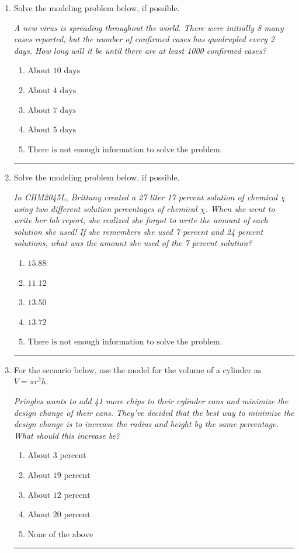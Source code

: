 \documentclass[14pt]{extbook}
\newcommand{\litem}[1]{\item#1\hspace*{-1cm}\rule{\textwidth}{0.4pt}}
\begin{document}
\begin{enumerate}
{\begin{enumerate}[label=\Alph*.]
\end{enumerate} }
\litem{
Solve the modeling problem below, if possible.
\begin{center}
    \textit{ A new virus is spreading throughout the world. There were initially 8 many cases reported, but the number of confirmed cases has quadrupled every 2 days. How long will it be until there are at least 1000 confirmed cases? }
\end{center}
\begin{enumerate}[label=\Alph*.]
\item \( \text{About } 10 \text{ days} \)
\item \( \text{About } 4 \text{ days} \)
\item \( \text{About } 7 \text{ days} \)
\item \( \text{About } 5 \text{ days} \)
\item \( \text{There is not enough information to solve the problem.} \)

\end{enumerate} }
\litem{
Solve the modeling problem below, if possible.
\begin{center}
    \textit{ In CHM2045L, Brittany created a 27 liter 17 percent solution of chemical $\chi$ using two different solution percentages of chemical $\chi$. When she went to write her lab report, she realized she forgot to write the amount of each solution she used! If she remembers she used 7 percent and 24 percent solutions, what was the amount she used of the 7 percent solution? }
\end{center}
\begin{enumerate}[label=\Alph*.]
\item \( 15.88 \)
\item \( 11.12 \)
\item \( 13.50 \)
\item \( 13.72 \)
\item \( \text{There is not enough information to solve the problem.} \)

\end{enumerate} }
\litem{
For the scenario below, use the model for the volume of a cylinder as $V = \pi r^2 h$.
\begin{center}
    \textit{ Pringles wants to add 41 \text{percent} more chips to their cylinder cans and minimize the design change of their cans. They've decided that the best way to minimize the design change is to increase the radius and height by the same percentage. What should this increase be? }
\end{center}
\begin{enumerate}[label=\Alph*.]
\item \( \text{About } 3 \text{ percent} \)
\item \( \text{About } 19 \text{ percent} \)
\item \( \text{About } 12 \text{ percent} \)
\item \( \text{About } 20 \text{ percent} \)
\item \( \text{None of the above} \)

\end{enumerate} }
\end{enumerate}
\end{document}
